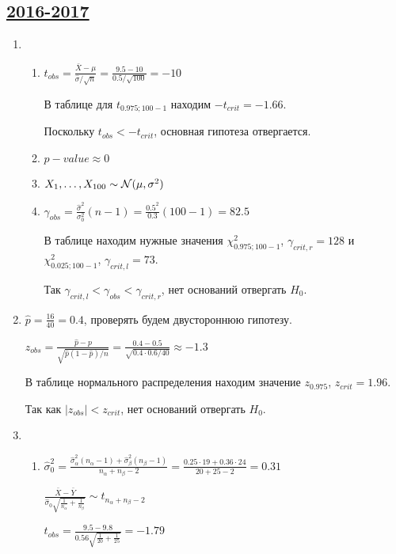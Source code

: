 \subsection[2016-2017]{\hyperref[sec:kr_04_2016_2017]{2016-2017}}
\label{sec:sol_kr_04_2016_2017}


\begin{enumerate}
\item
\begin{enumerate}
\item $t_{obs} = \frac{\bar X - \mu}{\hat\sigma/\sqrt{n}} = \frac{9.5-10}{0.5/\sqrt{100}} = -10$

В таблице для $t_{0.975;100-1}$ находим $-t_{crit} = -1.66$.

Поскольку $t_{obs} < -t_{crit}$, основная гипотеза отвергается.
\item $p-value \approx 0$
\item $X_1, \ldots, X_{100} \sim \mathcal{N}(\mu, \sigma^2)$
\item $\gamma_{obs} = \frac{\hat{\sigma}^2}{\sigma^2_0}(n-1) =
\frac{0.5^2}{0.3}(100-1) = 82.5$

В таблице находим нужные значения $\chi^2_{0.975;100-1}$, $\gamma_{crit, r} = 128$
и $\chi^2_{0.025;100-1}$, $\gamma_{crit, l} = 73$.

Так $\gamma_{crit, l} < \gamma_{obs} < \gamma_{crit, r}$, нет оснований отвергать $H_0$.
\end{enumerate}
\item $\hat{p} = \frac{16}{40} = 0.4$, проверять будем двустороннюю гипотезу.

$z_{obs} = \frac{\hat{p} - p}{\sqrt{\hat{p}(1-\hat{p})/n}} =
\frac{0.4-0.5}{\sqrt{0.4\cdot0.6/40}} \approx -1.3$

В таблице нормального распределения находим значение $z_{0.975}$, $z_{crit} = 1.96$.

Так как $\vert z_{obs} \vert < z_{crit}$, нет оснований отвергать $H_0$.
\item
\begin{enumerate}
\item $\hat{\sigma}_0^2 = \frac{\hat{\sigma}_\alpha^2(n_\alpha -1) +
\hat{\sigma}_\beta^2(n_\beta-1)}{n_\alpha + n_\beta-2} = \frac{0.25\cdot19 + 0.36\cdot24}{20+25-2} = 0.31$

$\frac{\bar{X} - \bar{Y}}{\hat{\sigma}_0 \sqrt{\frac{1}{n_\alpha} + \frac{1}{n_\beta}}} \sim t_{n_\alpha + n_\beta-2}$

$t_{obs} = \frac{9.5-9.8}{0.56\sqrt{\frac{1}{20}+ \frac{1}{25}}} = -1.79$


\end{enumerate}
\end{enumerate}
